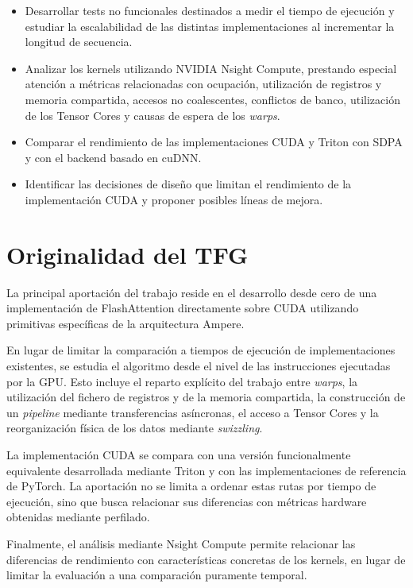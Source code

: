 \begin{itemize}
\item Desarrollar tests no funcionales destinados a medir el tiempo de ejecución y estudiar la escalabilidad de las distintas implementaciones al incrementar la longitud de secuencia.

\item Analizar los kernels utilizando NVIDIA Nsight Compute, prestando especial atención a métricas relacionadas con ocupación, utilización de registros y memoria compartida, accesos no coalescentes, conflictos de banco, utilización de los Tensor Cores y causas de espera de los \textit{warps}.

\item Comparar el rendimiento de las implementaciones CUDA y Triton con SDPA y con el backend basado en cuDNN.

\item Identificar las decisiones de diseño que limitan el rendimiento de la implementación CUDA y proponer posibles líneas de mejora.

\end{itemize}

\section{Originalidad del TFG}

La principal aportación del trabajo reside en el desarrollo desde cero de una implementación de FlashAttention directamente sobre CUDA utilizando primitivas específicas de la arquitectura Ampere.

En lugar de limitar la comparación a tiempos de ejecución de implementaciones existentes, se estudia el algoritmo desde el nivel de las instrucciones ejecutadas por la GPU. Esto incluye el reparto explícito del trabajo entre \textit{warps}, la utilización del fichero de registros y de la memoria compartida, la construcción de un \textit{pipeline} mediante transferencias asíncronas, el acceso a Tensor Cores y la reorganización física de los datos mediante \textit{swizzling}.

La implementación CUDA se compara con una versión funcionalmente equivalente desarrollada mediante Triton y con las implementaciones de referencia de PyTorch. La aportación no se limita a ordenar estas rutas por tiempo de ejecución, sino que busca relacionar sus diferencias con métricas hardware obtenidas mediante perfilado.

Finalmente, el análisis mediante Nsight Compute permite relacionar las diferencias de rendimiento con características concretas de los kernels, en lugar de limitar la evaluación a una comparación puramente temporal.

